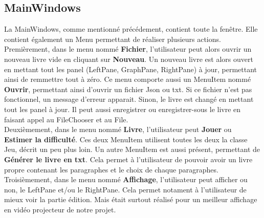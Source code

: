 		\subsection{MainWindows}
			La MainWindows, comme mentionné précédement, contient toute la fenêtre. Elle contient également un Menu permettant de réaliser plusieurs actions.\\
			Premièrement, dans le menu nommé \textbf{Fichier}, l'utilisateur peut alors ouvrir un nouveau livre vide en cliquant sur \textbf{Nouveau}. Un nouveau livre est alors ouvert en mettant tout les panel (LeftPane, GraphPane, RightPane) à jour, permettant ainsi de remmettre tout à zéro. Ce menu comporte aussi un MenuItem nommé \textbf{Ouvrir}, permettant ainsi d'ouvrir un fichier Json ou txt. Si ce fichier n'est pas fonctionnel, un message d'erreur apparait. Sinon, le livre est changé en mettant tout les panel à jour. Il peut aussi enregistrer ou enregistrer-sous le livre en faisant appel au FileChooser et au File.\\
			Deuxièmement, dans le menu nommé \textbf{Livre}, l'utilisateur peut \textbf{Jouer} ou \textbf{Estimer la difficulté}. Ces deux MenuItem utilisent toutes les deux la classe Jeu, décrit un peu plus loin. Un autre MenuItem est aussi présent, permettant de \textbf{Générer le livre en txt}. Cela permet à l'utilisateur de pouvoir avoir un livre propre contenant les paragraphes et le choix de chaque paragraphes.\\
			Troisièmement, dans le menu nommé \textbf{Affichage}, l'utilisateur peut afficher ou non, le LeftPane et/ou le RightPane. Cela permet notament à l'utilisateur de mieux voir la partie édition. Mais était surtout réalisé pour un meilleur affichage en vidéo projecteur de notre projet.\\

